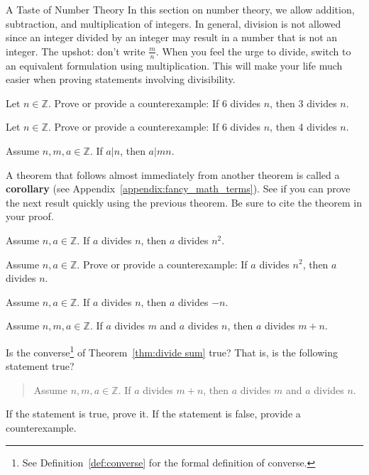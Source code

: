 \begin{section}{A Taste of Number Theory}
In this section on number theory, we allow addition, subtraction, and multiplication of integers.  In general, division is not allowed since an integer divided by an integer may result in a number that is not an integer. The upshot: don't write $\frac{m}{n}$.  When you feel the urge to divide, switch to an equivalent formulation using multiplication. This will make your life much easier when proving statements involving divisibility.

\begin{problem}
Let $n\in\mathbb{Z}$.  Prove or provide a counterexample: If 6 divides $n$, then 3 divides $n$.\end{problem}

\begin{problem}
Let $n\in\mathbb{Z}$.  Prove or provide a counterexample: If 6 divides $n$, then 4 divides $n$.
\end{problem}

\begin{theorem}
Assume $n,m,a\in\mathbb{Z}$.  If $a|n$, then $a|mn$.
\end{theorem}

A theorem that follows almost immediately from another theorem is called a \textbf{corollary} (see Appendix~\ref{appendix:fancy_math_terms}).  See if you can prove the next result quickly using the previous theorem.  Be sure to cite the theorem in your proof.

\begin{corollary}
Assume $n,a\in\mathbb{Z}$.  If $a$ divides $n$, then $a$ divides $n^2$.
\end{corollary}

\begin{problem}
Assume $n,a\in\mathbb{Z}$.  Prove or provide a counterexample:  If $a$ divides $n^2$, then $a$ divides $n$.
\end{problem}

\begin{theorem}
Assume $n,a\in\mathbb{Z}$. If $a$ divides $n$, then $a$ divides $-n$. 
\end{theorem}

\begin{theorem}\label{thm:divide sum}
Assume $n,m,a\in\mathbb{Z}$. If $a$ divides $m$ and $a$ divides $n$, then $a$ divides $m+n$. 
\end{theorem}

\begin{problem}
Is the converse\footnote{See Definition~\ref{def:converse} for the formal definition of converse.} of Theorem~\ref{thm:divide sum} true?  That is, is the following statement true?
\begin{quote}
Assume $n,m,a\in\mathbb{Z}$. If $a$ divides $m+n$, then $a$ divides $m$ and $a$ divides $n$.
\end{quote}
If the statement is true, prove it.  If the statement is false, provide a counterexample.
\end{problem}


\end{section}
